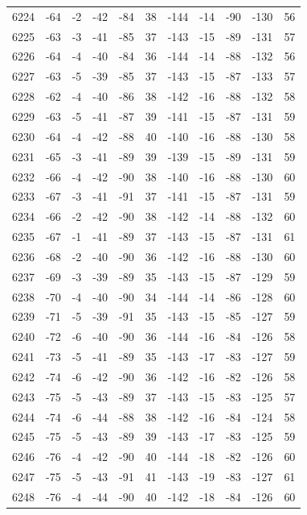 \begin{table}[H]
\begin{tabular}{lllllllllll}
6224 & -64 & -2 & -42 & -84 & 38 & -144 & -14 & -90 & -130 & 56 \\
6225 & -63 & -3 & -41 & -85 & 37 & -143 & -15 & -89 & -131 & 57 \\
6226 & -64 & -4 & -40 & -84 & 36 & -144 & -14 & -88 & -132 & 56 \\
6227 & -63 & -5 & -39 & -85 & 37 & -143 & -15 & -87 & -133 & 57 \\
6228 & -62 & -4 & -40 & -86 & 38 & -142 & -16 & -88 & -132 & 58 \\
6229 & -63 & -5 & -41 & -87 & 39 & -141 & -15 & -87 & -131 & 59 \\
6230 & -64 & -4 & -42 & -88 & 40 & -140 & -16 & -88 & -130 & 58 \\
6231 & -65 & -3 & -41 & -89 & 39 & -139 & -15 & -89 & -131 & 59 \\
6232 & -66 & -4 & -42 & -90 & 38 & -140 & -16 & -88 & -130 & 60 \\
6233 & -67 & -3 & -41 & -91 & 37 & -141 & -15 & -87 & -131 & 59 \\
6234 & -66 & -2 & -42 & -90 & 38 & -142 & -14 & -88 & -132 & 60 \\
6235 & -67 & -1 & -41 & -89 & 37 & -143 & -15 & -87 & -131 & 61 \\
6236 & -68 & -2 & -40 & -90 & 36 & -142 & -16 & -88 & -130 & 60 \\
6237 & -69 & -3 & -39 & -89 & 35 & -143 & -15 & -87 & -129 & 59 \\
6238 & -70 & -4 & -40 & -90 & 34 & -144 & -14 & -86 & -128 & 60 \\
6239 & -71 & -5 & -39 & -91 & 35 & -143 & -15 & -85 & -127 & 59 \\
6240 & -72 & -6 & -40 & -90 & 36 & -144 & -16 & -84 & -126 & 58 \\
6241 & -73 & -5 & -41 & -89 & 35 & -143 & -17 & -83 & -127 & 59 \\
6242 & -74 & -6 & -42 & -90 & 36 & -142 & -16 & -82 & -126 & 58 \\
6243 & -75 & -5 & -43 & -89 & 37 & -143 & -15 & -83 & -125 & 57 \\
6244 & -74 & -6 & -44 & -88 & 38 & -142 & -16 & -84 & -124 & 58 \\
6245 & -75 & -5 & -43 & -89 & 39 & -143 & -17 & -83 & -125 & 59 \\
6246 & -76 & -4 & -42 & -90 & 40 & -144 & -18 & -82 & -126 & 60 \\
6247 & -75 & -5 & -43 & -91 & 41 & -143 & -19 & -83 & -127 & 61 \\
6248 & -76 & -4 & -44 & -90 & 40 & -142 & -18 & -84 & -126 & 60 \\

\end{tabular}
\end{table}
